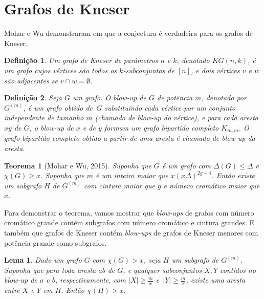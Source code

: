 \documentclass{article}
\newtheorem{teorema}{Teorema}[section]
\newtheorem{lema}{Lema}[teorema]
\newtheorem{definicao}{Definição}[section]
\begin{document}
\section{Grafos de Kneser}
Mohar e Wu demonstraram em \cite{mohar2015triangle} que a conjectura é verdadeira para os grafos de Kneser.

\begin{definicao}
Um grafo de Kneser de parâmetros $n$ e $k$, denotado $KG(n,k)$, é um grafo cujos vértices são todos os $k$-subconjuntos de $[n]$, e dois vértices $v$ e $w$ são adjacentes se $v \cap w = \emptyset$.
\end{definicao}

\begin{definicao}
Seja $G$ um grafo. O \textit{blow-up} de $G$ de potência $m$, denotado por $G^{(m)}$, é um grafo obtido de~$G$ substituindo cada vértice por um conjunto independente de tamanho $m$ (chamado de \textit{blow-up} do vértice), e para cada aresta $xy$ de $G$, o \textit{blow-up} de $x$ e de $y$ formam um grafo bipartido completo $K_{m,m}$. O grafo bipartido completo obtido a partir de uma aresta é chamado de \textit{blow-up} da aresta.
\end{definicao}

\begin{teorema}[Mohar e Wu, 2015]\label{moharwuthm}
Suponha que $G$ é um grafo com $\Delta(G) \leq \Delta$ e $\chi(G) \geq x$. Suponha que $m$ é um inteiro maior que $x(x\Delta)^{2g-4}$. Então existe um subgrafo $H$ de $G^{(m)}$ com cintura maior que $g$ e número cromático maior que $x$.
\end{teorema}

Para demonstrar o teorema, vamos mostrar que \textit{blow-ups} de grafos com número cromático grande contém subgrafos com número cromático e cintura grandes. E também que grafos de Kneser contém \textit{blow-ups} de grafos de Kneser menores com potência grande como subgrafos.

\begin{lema}\label{lemma1kg}
Dado um grafo $G$ com $\chi(G) > x$, seja $H$ um subgrafo de $G^{(m)}$. Suponha que para toda aresta $ab$ de $G$, e qualquer subconjuntos $X,Y$ contidos no \textit{blow-up} de $a$ e $b$, respectivamente, com $|X| \geq \frac{m}{x}$ e~$|Y| \geq \frac{m}{x}$, existe uma aresta entre $X$ e $Y$ em $H$. Então $\chi(H) > x$.
\end{lema}
\end{document}
